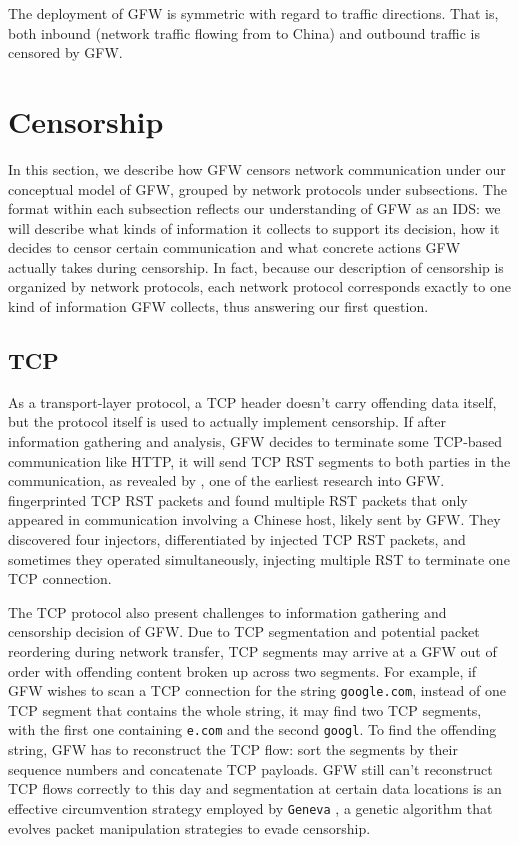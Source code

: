 \documentclass[sigconf, screen, balance=false]{acmart}
\begin{document}
The deployment of GFW is symmetric with regard to traffic directions. That is, both inbound (network traffic flowing from to China) and outbound traffic is censored by GFW.

\section{Censorship}

In this section, we describe how GFW censors network communication under our conceptual model of GFW, grouped by network protocols under subsections. The format within each subsection reflects our understanding of GFW as an IDS: we will describe what kinds of information it collects to support its decision, how it decides to censor certain communication and what concrete actions GFW actually takes during censorship. In fact, because our description of censorship is organized by network protocols, each network protocol corresponds exactly to one kind of information GFW collects, thus answering our first question.

\subsection{TCP}

As a transport-layer protocol, a TCP header doesn't carry offending data itself, but the protocol itself is used to actually implement censorship. If after information gathering and analysis, GFW decides to terminate some TCP-based communication like HTTP, it will send TCP RST segments to both parties in the communication, as revealed by \citeauthor{clayton2006ignoring}, one of the earliest research into GFW. \citeauthor{detecting-forged-tcp-reset} fingerprinted TCP RST packets and found multiple RST packets that only appeared in communication involving a Chinese host, likely sent by GFW. They discovered four injectors, differentiated by injected TCP RST packets, and sometimes they operated simultaneously, injecting multiple RST to terminate one TCP connection.

The TCP protocol also present challenges to information gathering and censorship decision of GFW. Due to TCP segmentation and potential packet reordering during network transfer, TCP segments may arrive at a GFW out of order with offending content broken up across two segments. For example, if GFW wishes to scan a TCP connection for the string \texttt{google.com}, instead of one TCP segment that contains the whole string, it may find two TCP segments, with the first one containing \texttt{e.com} and the second \texttt{googl}. To find the offending string, GFW has to reconstruct the TCP flow: sort the segments by their sequence numbers and concatenate TCP payloads. GFW still can't reconstruct TCP flows correctly to this day and segmentation at certain data locations is an effective circumvention strategy employed by \texttt{Geneva} \cite{geneva}, a genetic algorithm that evolves packet manipulation strategies to evade censorship.
\end{document}
